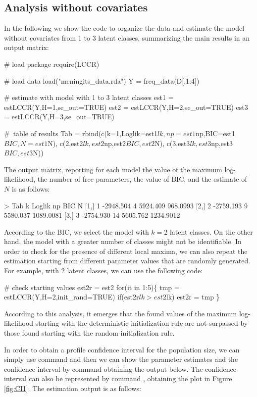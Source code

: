 \subsection{Analysis without covariates}

In the following we show the code to organize the data and estimate the model without covariates from 1 to 3 latent classes, summarizing the main results in an output matrix:

\begin{example*}
\# load package
require(LCCR)

# load data
load("meningits_data.rda")
Y = freq_data(D[,1:4])

# estimate with model with 1 to 3 latent classes
est1 = estLCCR(Y,H=1,se_out=TRUE)
est2 = estLCCR(Y,H=2,se_out=TRUE)
est3 = estLCCR(Y,H=3,se_out=TRUE)

# table of results
Tab = rbind(c(k=1,Loglik=est1$lk,np=est1$np,BIC=est1$BIC,N=est1$N),
            c(2,est2$lk,est2$np,est2$BIC,est2$N),
            c(3,est3$lk,est3$np,est3$BIC,est3$N))
\end{example*}
%
The output matrix, reporting for each model the value of the maximum log-likelihood, the number of free parameters, the value of BIC, and the estimate of $N$ is as follows:

\begin{example*}
> Tab
     k    Loglik np      BIC         N
[1,] 1 -2948.504  4 5924.409  968.0993
[2,] 2 -2759.193  9 5580.037 1089.0081
[3,] 3 -2754.930 14 5605.762 1234.9012
\end{example*}

According to the BIC, we select the model with $k=2$ latent classes.
On the other hand, the model with a greater number of classes might not be identifiable.
In order to check for the presence of different local maxima, we can also repeat the estimation starting from different parameter values that are randomly generated.
For example, with 2 latent classes, we can use the following code:

\begin{example*}
# check starting values
est2r = est2
for(it in 1:5)\{
  tmp = estLCCR(Y,H=2,init_rand=TRUE)
  if(est2r$lk>est2$lk) est2r = tmp
\}
\end{example*}
%
According to this analysis, it emerges that the found values of the maximum log-likelihood starting with the deterministic initialization rule are not surpassed by those found starting with the random initialization rule.

In order to obtain a profile confidence interval for the population size, we can simply use command  and then we can show the parameter estimates and the confidence interval by command  obtaining the output below.
The confidence interval can also be represented by command , obtaining the plot in Figure \ref{fig:CI1}.
The estimation output is as follows:

